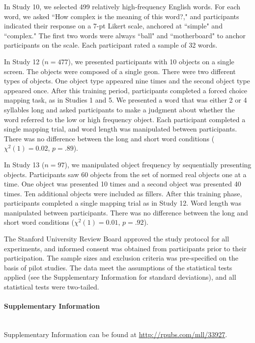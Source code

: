 \documentclass[12pt]{article}
\renewcommand\refname{References and Notes}
\begin{document}
In Study 10, we selected 499 relatively high-frequency English words. For each word, we asked ``How complex is the meaning of this word?," and participants indicated their response on a 7-pt Likert scale, anchored at ``simple" and ``complex." The first two words were always ``ball" and ``motherboard" to anchor participants on the scale. Each participant rated a sample of 32 words.

In Study 12 ($n = 477$), we presented participants with 10 objects on a single screen. The objects were composed of a single geon. There were two different types of objects. One object type appeared nine times and the second object type appeared once. After this training period, participants completed a forced choice mapping task, as in Studies 1 and 5. We presented a word that was either 2 or 4 syllables long and asked participants to make a judgment about whether the word referred to the low or high frequency object. Each participant completed a single mapping trial, and word length was manipulated between participants. There was no difference between the long and short word conditions ($\chi ^2(1) = 0.02$,  $p = .89$).

In Study 13 ($n = 97$), we manipulated object frequency by sequentially presenting objects. Participants saw 60 objects from the  set of normed real objects one at a time. One object was presented 10 times and a second object was presented 40 times. Ten additional objects were included as fillers. After this training phase, participants completed a single mapping trial as in Study 12. Word length was manipulated between participants. There was no difference between the long and short word conditions ($\chi ^2(1) = 0.01$,  $p = .92$).

The Stanford University Review Board approved the study protocol for all experiments, and informed consent was obtained from participants prior to their participation. The sample sizes and exclusion criteria was pre-specified on the basis of pilot studies. The data meet the assumptions of the statistical tests applied (see the Supplementary Information for standard deviations), and all statistical tests were two-tailed.

\renewcommand{\refname}{\normalsize References}



\paragraph*{Supplementary Information}\mbox{}\\
Supplementary Information can be found at \url{http://rpubs.com/mll/33927}.
\end{document}
